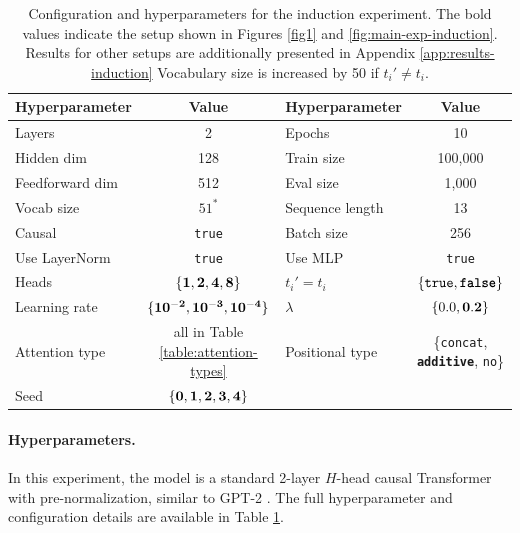 \documentclass{article}
\theoremstyle{plain}
\theoremstyle{definition}
\theoremstyle{remark}
\begin{document}
\begin{table}[h]
  \centering
  \renewcommand{\arraystretch}{1.15}
  \setlength{\tabcolsep}{10pt}
  \begin{tabular}{l c l c}
    \hline
    \textbf{Hyperparameter} & \textbf{Value} & \textbf{Hyperparameter} & \textbf{Value} \\
    \hline
    Layers           & 2   & Epochs     & 10 \\
    Hidden dim       & 128 & Train size         & 100{,}000 \\
    Feedforward dim  & 512 & Eval size          & 1{,}000 \\
    Vocab size       & $51^*$  & Sequence length & 13 \\
    Causal           & \texttt{true} & Batch size     & 256 \\
    Use LayerNorm    & \texttt{true} & Use MLP        & \texttt{true} \\
    \hline
    Heads            & $\bf \{1,2,4,8\}$ & $t_i' = t_i$ & $\{\texttt{true},\textbf{\texttt{false}}\}$ \\
    Learning rate    & $\bf \{10^{-2},10^{-3},10^{-4}\}$ & $\lambda$ & $\{0.0,\bf{0.2}\}$ \\
    Attention type   & all in Table \ref{table:attention-types} & Positional type  & \{\texttt{concat}, \textbf{\texttt{additive}}, \texttt{no}\} \\
    Seed             & $\bf \{0,1,2,3,4\}$ & & \\
    \hline
  \end{tabular}
  \vspace{3pt}
  \caption{Configuration and hyperparameters for the induction experiment. The bold values indicate the setup shown in Figures \ref{fig1} and \ref{fig:main-exp-induction}. Results for other setups are additionally presented in Appendix \ref{app:results-induction} Vocabulary size is increased by 50 if $t_i' \ne t_i$.}
  \label{tab:induction-config-sweep}
\end{table}

\paragraph{Hyperparameters.}

In this experiment, the model is a standard 2-layer $H$-head causal Transformer with pre-normalization, similar to GPT-2 \cite{radford2019language}. The full hyperparameter and configuration details are available in Table \ref{tab:induction-config-sweep}.
\end{document}

